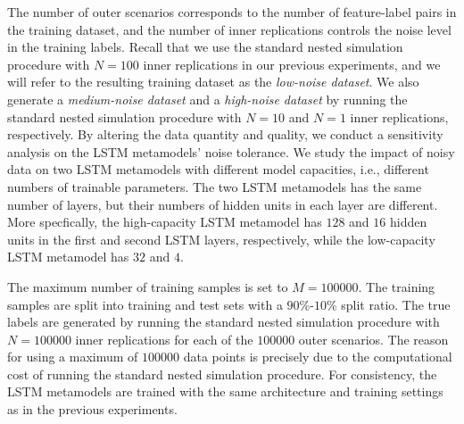 The number of outer scenarios corresponds to the number of feature-label pairs in the training dataset, and the number of inner replications controls the noise level in the training labels.
Recall that we use the standard nested simulation procedure with $N=100$ inner replications in our previous experiments, and we will refer to the resulting training dataset as the \textit{low-noise dataset}.
We also generate a \textit{medium-noise dataset} and a \textit{high-noise dataset} by running the standard nested simulation procedure with $N=10$ and $N=1$ inner replications, respectively.
By altering the data quantity and quality, we conduct a sensitivity analysis on the LSTM metamodels' noise tolerance.
We study the impact of noisy data on two LSTM metamodels with different model capacities, i.e., different numbers of trainable parameters.
The two LSTM metamodels has the same number of layers, but their numbers of hidden units in each layer are different.
More specfically, the high-capacity LSTM metamodel has $128$ and $16$ hidden units in the first and second LSTM layers, respectively, while the low-capacity LSTM metamodel has $32$ and $4$.

The maximum number of training samples is set to $M = \num{100000}$.
The training samples are split into training and test sets with a $90\%$-$10\%$ split ratio.
The true labels are generated by running the standard nested simulation procedure with $N=\num{100000}$ inner replications for each of the $\num{100000}$ outer scenarios.
The reason for using a maximum of $\num{100000}$ data points is precisely due to the computational cost of running the standard nested simulation procedure.
For consistency, the LSTM metamodels are trained with the same architecture and training settings as in the previous experiments.

